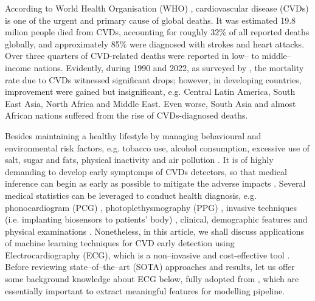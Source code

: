 \label{sec:intro}
According to World Health Organisation (WHO) \cite{who2025cvd}, cardiovascular disease (CVDs)
is one of the urgent and primary cause of global deaths. It was estimated 19.8 milion people died from CVDs, accounting for roughly 32\% of all reported deaths globally,
and approximately 85\% were diagnosed with strokes and heart attacks. Over three quarters of CVD-related deaths were reported in low– to middle–income nations.
Evidently, during 1990 and 2022, as surveyed by \cite{LINDSTROM20222372, martin2025heart}, the mortality rate due to CVDs witnessed significant drops; however, in developing countries, improvement were gained but insignificant, e.g. Central Latin America, South East Asia, North Africa and Middle East.
Even worse, South Asia and almost African nations suffered from the rise of CVDs-diagnosed deaths.

Besides maintaining a healthy lifestyle by managing behavioural and environmental risk factors, e.g. tobacco use, alcohol consumption, excessive use of salt, sugar and fats, physical inactivity and air pollution \cite{whf2023, who2025world}.
It is of highly demanding to develop early symptomps of CVDs detectors, so that medical inference can begin as early as possible to mitigate the adverse impacts \cite{who2025cvd}.
Several medical statistics can be leveraged to conduct health diagnosis, e.g.  phonocardiogram (PCG) \cite{shuvo2021cardioxnet}, photoplethysmography (PPG) \cite{simonyan2021spectral}, invasive techniques (i.e. implanting biosensors to patients' body) \cite{CTC4CVD}, clinical, demographic features and physical examinations \cite{nikam2020cardiovascular, qian2022cardiovascular, rahim2021integrated, yang2023predicting, akkaya2022comparative, chicco2021machine, ghorashi2023leveraging, joo2020clinical}.
Nonetheless, in this article, we shall discuss applications of machine learning techniques for CVD early detection using Electrocardiography (ECG), which is a non–invasive and cost-effective tool \cite{sinha2023dasmcc, siontis2021ai, strodthoff2021ptbxl}. 
Before reviewing state–of–the–art (SOTA) approaches and results, let us offer some background knowledge about ECG below, fully adopted from \cite{GOLDBERGER2018xi}, which are essentially important to extract meaningful features for modelling pipeline.


